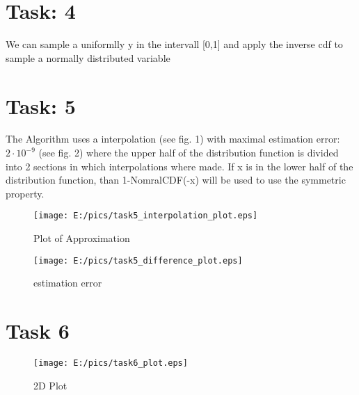 \documentclass{article}
\begin{document}
\section{Task: 4} %
We can sample a uniformlly y in the intervall [0,1] and apply the inverse cdf to sample a normally distributed variable

\newpage
\section{Task: 5} %
The Algorithm uses a interpolation (see fig. 1) with maximal estimation error: $2\cdot 10^{-9}$ (see fig. 2) where the upper half of the distribution function is divided into 2 sections in which interpolations where made. 
If x is in the lower half of the distribution function, than 1-NomralCDF(-x) will be used to use the symmetric property.
\begin{figure}[htbp]
	\centering
		\texttt{[image: E:/pics/task5\_interpolation\_plot.eps]}
		\caption{Plot of Approximation}
	\label{fig:task5_interpolation_plot}
\end{figure}
\begin{figure}[htbp]
	\centering
		\texttt{[image: E:/pics/task5\_difference\_plot.eps]}
	\caption{estimation error}
	\label{fig:task5_difference_plot}
\end{figure}

\newpage
\section{Task 6}
\begin{figure}[htbp]
	\centering
		\texttt{[image: E:/pics/task6\_plot.eps]}
	\caption{2D Plot}
	\label{fig:task6_plot}
\end{figure}
\end{document}

